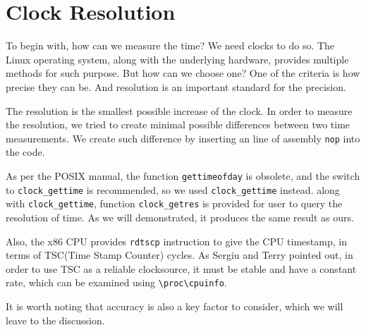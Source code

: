 \section{Clock Resolution}

To begin with, how can we measure the time? We need clocks to do so. The Linux operating system, along with the underlying hardware, provides multiple methods for such purpose. But how can we choose one? One of the criteria is how precise they can be. And resolution is an important standard for the precision.

The resolution is the smallest possible increase of the clock. In order to measure the resolution, we tried to create minimal possible differences between two time measurements. We create such difference by inserting an line of assembly \texttt{nop} into the code. 

As per the POSIX manual\cite{posix_clock_gettime}, the function \texttt{gettimeofday} is obsolete, and the switch to \texttt{clock\_gettime} is recommended, so we used \texttt{clock\_gettime} instead. along with \texttt{clock\_gettime}, function \texttt{clock\_getres} is provided for user to query the resolution of time. As we will demonstrated, it produces the same result as ours.

Also, the x86 CPU provides \texttt{rdtscp} instruction to give the CPU timestamp, in terms of TSC(Time Stamp Counter) cycles. As Sergiu and Terry pointed out, in order to use TSC as a reliable clocksource, it must be stable and have a constant rate, which can be examined using \texttt{\textbackslash{}proc\textbackslash{}cpuinfo}\cite{constant_tsc}.

It is worth noting that accuracy is also a key factor to consider, which we will leave to the discussion.